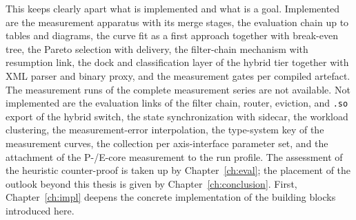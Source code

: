 \begin{nurlang}
This keeps clearly apart what is implemented and what is a goal. Implemented are the measurement apparatus with its
merge stages, the evaluation chain up to tables and diagrams, the curve fit as a first approach together with
break-even tree, the Pareto selection with delivery, the filter-chain mechanism with resumption link,
the dock and classification layer of the hybrid tier together with XML parser and binary proxy, and the
measurement gates per compiled artefact.
The measurement runs of the complete measurement series are not available. Not implemented are the evaluation links of the
filter chain, router, eviction, and \texttt{.so} export of the hybrid switch, the state synchronization with sidecar,
the workload clustering, the measurement-error interpolation, the type-system key of the measurement curves, the
collection per axis-interface parameter set, and the attachment of the P-/E-core measurement to the run profile. The
assessment of the heuristic counter-proof is taken up by Chapter~\ref{ch:eval}; the placement of the outlook
beyond this thesis is given by Chapter~\ref{ch:conclusion}. First, Chapter~\ref{ch:impl} deepens the
concrete implementation of the building blocks introduced here.
\end{nurlang}
